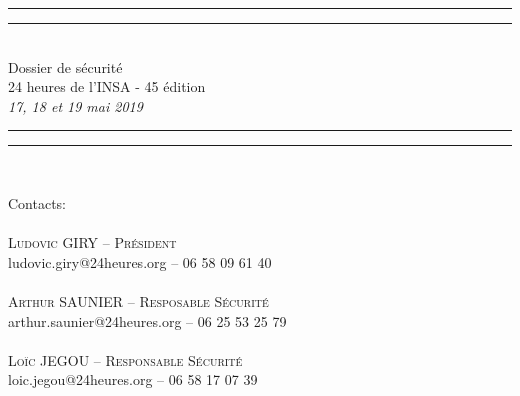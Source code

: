 \documentclass[hidelinks, paper=a4, fontsize=13pt]{report}
\begin{document}
\begin{center}
\rule[0.5ex]{\linewidth}{2pt}\vspace*{-\baselineskip}\vspace*{4.2pt}
\rule[0.5ex]{\linewidth}{1pt}\\[\baselineskip]
\huge Dossier de sécurité\\24 heures de l'INSA - 45 édition \\[4mm]
{\Large \textit{17, 18 et 19 mai 2019}}\\
\rule[0.5ex]{\linewidth}{1pt}\vspace*{-\baselineskip}\vspace{3.2pt}
\rule[0.5ex]{\linewidth}{2pt}\\
\vspace{20mm}
\end{center}
{\large Contacts:}\\
\vspace{3.5mm}
{\large\textsc{\\
Ludovic GIRY – Président\\}
ludovic.giry@24heures.org  – 06 58 09 61 40\\\\\textsc{
Arthur SAUNIER – Resposable Sécurité\\}
arthur.saunier@24heures.org – 06 25 53 25 79\\\\\textsc{
Loïc JEGOU – Responsable Sécurité\\}
loic.jegou@24heures.org  – 06 58 17 07 39\\\\}\\
\vspace{20mm}
\end{document}
